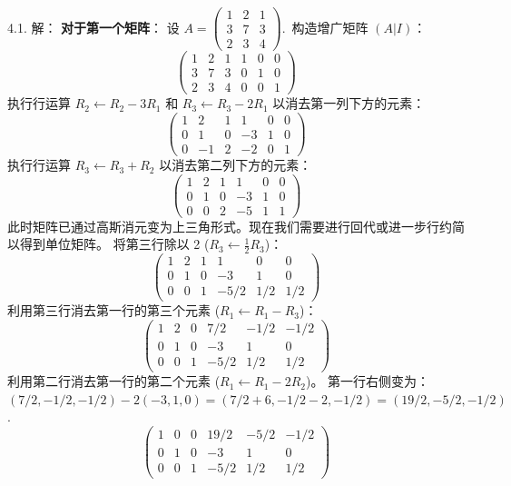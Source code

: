 \begin{exer}
\vspace{5ex}


4.1. 解：
\textbf{对于第一个矩阵}：
设 $A = \begin{pmatrix} 1 & 2 & 1 \\ 3 & 7 & 3 \\ 2 & 3 & 4 \end{pmatrix}$.~构造增广矩阵 $(A|I)$：
$$ \left(\begin{array}{ccc|ccc} 1 & 2 & 1 & 1 & 0 & 0 \\ 3 & 7 & 3 & 0 & 1 & 0 \\ 2 & 3 & 4 & 0 & 0 & 1 \end{array}\right) $$
执行行运算 $R_2 \leftarrow R_2 - 3R_1$ 和 $R_3 \leftarrow R_3 - 2R_1$ 以消去第一列下方的元素：
$$ \left(\begin{array}{ccc|ccc} 1 & 2 & 1 & 1 & 0 & 0 \\ 0 & 1 & 0 & -3 & 1 & 0 \\ 0 & -1 & 2 & -2 & 0 & 1 \end{array}\right) $$
执行行运算 $R_3 \leftarrow R_3 + R_2$ 以消去第二列下方的元素：
$$ \left(\begin{array}{ccc|ccc} 1 & 2 & 1 & 1 & 0 & 0 \\ 0 & 1 & 0 & -3 & 1 & 0 \\ 0 & 0 & 2 & -5 & 1 & 1 \end{array}\right) $$
此时矩阵已通过高斯消元变为上三角形式。现在我们需要进行回代或进一步行约简以得到单位矩阵。
将第三行除以 2 ($R_3 \leftarrow \frac{1}{2}R_3$)：
$$ \left(\begin{array}{ccc|ccc} 1 & 2 & 1 & 1 & 0 & 0 \\ 0 & 1 & 0 & -3 & 1 & 0 \\ 0 & 0 & 1 & -5/2 & 1/2 & 1/2 \end{array}\right) $$
利用第三行消去第一行的第三个元素 ($R_1 \leftarrow R_1 - R_3$)：
$$ \left(\begin{array}{ccc|ccc} 1 & 2 & 0 & 7/2 & -1/2 & -1/2 \\ 0 & 1 & 0 & -3 & 1 & 0 \\ 0 & 0 & 1 & -5/2 & 1/2 & 1/2 \end{array}\right) $$
利用第二行消去第一行的第二个元素 ($R_1 \leftarrow R_1 - 2R_2$)。
第一行右侧变为：\\
$(7/2, -1/2, -1/2) - 2(-3, 1, 0) = (7/2 + 6, -1/2 - 2, -1/2) = (19/2, -5/2, -1/2)$.~
$$ \left(\begin{array}{ccc|ccc} 1 & 0 & 0 & 19/2 & -5/2 & -1/2 \\ 0 & 1 & 0 & -3 & 1 & 0 \\ 0 & 0 & 1 & -5/2 & 1/2 & 1/2 \end{array}\right) $$

\end{exer}
